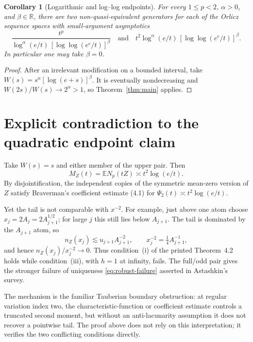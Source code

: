 \documentclass[11pt]{article}
\newtheorem{corollary}[theorem]{Corollary}
\theoremstyle{definition}
\theoremstyle{remark}
\newcommand{\E}{\mathbb E}
\newcommand{\asympc}{\mathrel{\asymp}}
\newcommand{\lesssimc}{\mathrel{\lesssim}}
\begin{document}
\begin{corollary}[Logarithmic and log--log endpoints]\label{cor:logs}
For every $1\leq p<2$, $\alpha>0$, and $\beta\in\mathbb R$, there are two
non-quasi-equivalent generators for each of the Orlicz sequence spaces with
small-argument asymptotics
\[
  \frac{t^p}
  {\log^\alpha(e/t)\,[\log\log(e^e/t)]^\beta}
  \quad\text{and}\quad
  t^2\log^\alpha(e/t)\,[\log\log(e^e/t)]^\beta.
\]
In particular one may take $\beta=0$.
\end{corollary}

\begin{proof}
After an irrelevant modification on a bounded interval, take
$W(s)=s^\alpha[\log(e+s)]^\beta$.  It is eventually nondecreasing and
$W(2s)/W(s)\to2^\alpha>1$, so Theorem~\ref{thm:main} applies.
\end{proof}

\section{Explicit contradiction to the quadratic endpoint claim}

Take $W(s)=s$ and either member of the upper pair.  Then
\begin{equation}\label{eq:t2log}
  M_Z(t)=\E N_p(tZ)\asympc t^2\log(e/t).
\end{equation}
By disjointification, the independent copies of the symmetric mean-zero
version of $Z$ satisfy Braverman's coefficient estimate (4.1) for
$\Psi_2(t)\asymp t^2\log(e/t)$.

Yet the tail is not comparable with $x^{-2}$.  For example, just above one
atom choose $x_j=2A_j=2A_{j+1}^{1/2}$; for large $j$ this still lies below
$A_{j+1}$.  The tail is dominated by the
$A_{j+1}$ atom, so
\[
  n_Z(x_j)\lesssimc u_{j+1}A_{j+1}^{-2},
  \qquad x_j^{-2}=\tfrac14A_{j+1}^{-1},
\]
and hence $n_Z(x_j)/x_j^{-2}\to0$.  Thus condition~(i) of the printed
Theorem~4.2 holds while condition~(iii), with $h=1$ at infinity, fails.  The
full/odd pair gives the stronger failure of uniqueness
\eqref{eq:robust-failure} asserted in Astashkin's survey.

The mechanism is the familiar Tauberian boundary obstruction: at regular
variation index two, the characteristic-function or coefficient estimate
controls a truncated second moment, but without an anti-lacunarity assumption
it does not recover a pointwise tail.  The proof above does not rely on this
interpretation; it verifies the two conflicting conditions directly.
\end{document}
